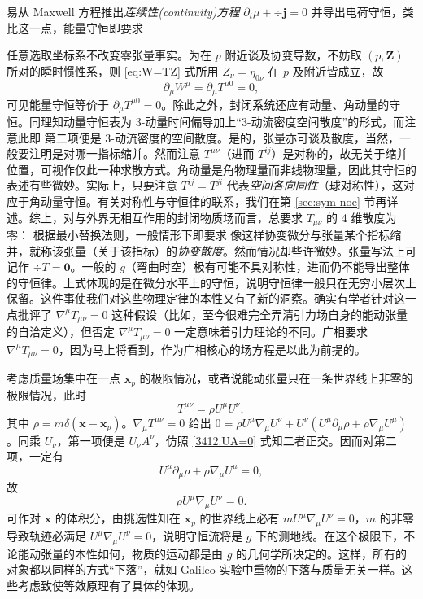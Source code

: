 易从 Maxwell 方程推出\textit{连续性(continuity)方程} $\partial_t\mu+\div\bm j=0$ 并导出电荷守恒，类比这一点，能量守恒即要求

任意选取坐标系不改变零张量事实。为在 $p$ 附近谈及协变导数，不妨取 $(p,\bm Z)$ 所对的瞬时惯性系，则 \eqref{eq:W=TZ} 式所用 $Z_\nu=\eta_{0\nu}$ 在 $p$ 及附近皆成立，故
\[
    \partial_\mu W^\mu=\partial_\mu T^{\mu 0}=0,
\]
可见能量守恒等价于 $\partial_\mu T^{\mu 0}=0$。除此之外，封闭系统还应有动量、角动量的守恒。同理知动量守恒表为 3-动量时间偏导加上“3-动流密度空间散度”的形式，而注意此即
第二项便是 3-动流密度的空间散度。是的，张量亦可谈及散度，当然，一般要注明是对哪一指标缩并。然而注意 $T^{\mu\nu}$（进而 $T^{ij}$）是对称的，故无关于缩并位置，可视作仅此一种求散方式。角动量是角物理量而非线物理量，因此其守恒的表述有些微妙。实际上，只要注意 $T^{ij}=T^{ji}$ 代表\textit{空间各向同性}（球对称性），这对应于角动量守恒。有关对称性与守恒律的联系，我们在第 \ref{sec:sym-noe} 节再详述。综上，对与外界无相互作用的封闭物质场而言，总要求 $T_{\mu\nu}$ 的 4 维散度为零：
根据最小替换法则，一般情形下即要求
像这样协变微分与张量某个指标缩并，就称该张量（关于该指标）的\textit{协变散度}。然而情况却些许微妙。张量写法上可记作 $\div T=\bm 0$。一般的 $g$（弯曲时空）极有可能不具对称性，进而仍不能导出整体的守恒律。上式体现的是在微分水平上的守恒，说明守恒律一般只在无穷小层次上保留。这件事使我们对这些物理定律的本性又有了新的洞察。确实有学者针对这一点批评了 $\nabla^\mu T_{\mu\nu}=0$ 这种假设（比如，至今很难完全弄清引力场自身的能动张量的自洽定义），但否定 $\nabla^\mu T_{\mu\nu}=0$ 一定意味着引力理论的不同。广相要求 $\nabla^\mu T_{\mu\nu}=0$，因为马上将看到，作为广相核心的场方程是以此为前提的。

考虑质量场集中在一点 $\bm x_p$ 的极限情况，或者说能动张量只在一条世界线上非零的极限情况，此时
\[
T^{\mu\nu}=\rho U^\mu U^\nu,
\]
其中 $\rho=m\delta(\bm x-\bm x_p)$。$\nabla_\mu T^{\mu\nu}=0$ 给出 $0=\rho U^\mu \nabla_\mu U^\nu+ U^\nu (U^\mu\partial_\mu\rho+\rho\nabla_\mu U^\mu)$。同乘 $U_\nu$，第一项便是 $U_\nu A^\nu$，仿照 \eqref{3412.UA=0} 式知二者正交。因而对第二项，一定有
\[
U^\mu\partial_\mu\rho+\rho\nabla_\mu U^\mu=0,
\]
故
\[
\rho U^\mu \nabla_\mu U^\nu=0.
\]
可作对 $\bm x$ 的体积分，由挑选性知在 $\bm x_p$ 的世界线上必有 $m U^\mu \nabla_\mu U^\nu=0$，$m$ 的非零导致轨迹必满足 $U^\mu \nabla_\mu U^\nu=0$，说明守恒流将是 $g$ 下的测地线。在这个极限下，不论能动张量的本性如何，物质的运动都是由 $g$ 的几何学所决定的。这样，所有的对象都以同样的方式“下落”，就如 Galileo 实验中重物的下落与质量无关一样。这些考虑致使等效原理有了具体的体现。

